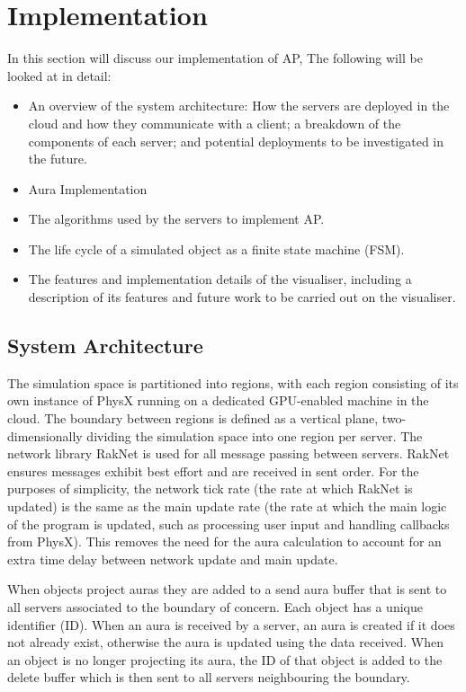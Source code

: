 \chapter{Implementation}
In this section will discuss our implementation of AP, The following will be looked at in detail: \begin{itemize}
	\item An overview of the system architecture: How the servers are deployed in the cloud and how they communicate with a client; a breakdown of the components of each server; and potential deployments to be investigated in the future.
	\item Aura Implementation
	\item The algorithms used by the servers to implement AP.
	\item The life cycle of a simulated object as a finite state machine (FSM).
	\item The features and implementation details of the visualiser, including a description of its features and future work to be carried out on the visualiser.
\end{itemize}

\section{System Architecture}
The simulation space is partitioned into regions, with each region consisting of its own instance of PhysX running on a dedicated GPU-enabled machine in the cloud. The boundary between regions is defined as a vertical plane, two-dimensionally dividing the simulation space into one region per server. The network library RakNet is used for all message passing between servers. RakNet ensures messages exhibit best effort and are received in sent order. For the purposes of simplicity, the network tick rate (the rate at which RakNet is updated) is the same as the main update rate (the rate at which the main logic of the program is updated, such as processing user input and handling callbacks from PhysX). This removes the need for the aura calculation to account for an extra time delay between network update and main update.

When objects project auras they are added to a send aura buffer that is sent to all servers associated to the boundary of concern. Each object has a unique identifier (ID). When an aura is received by a server, an aura is created if it does not already exist, otherwise the aura is updated using the data received. When an object is no longer projecting its aura, the ID of that object is added to the delete buffer which is then sent to all servers neighbouring the boundary.


